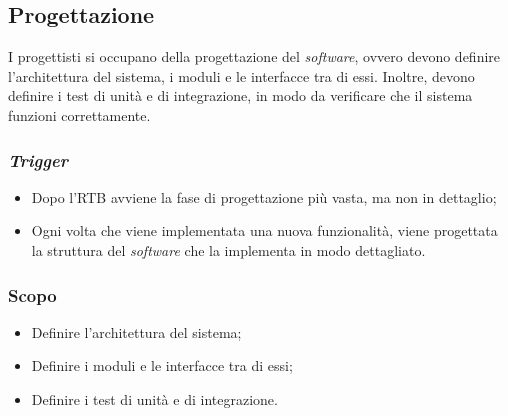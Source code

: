 \subsection{Progettazione}
\label{progettazione}

I progettisti si occupano della progettazione del \textit{software}, ovvero
devono definire l'architettura del sistema, i moduli e le interfacce tra di
essi. Inoltre, devono definire i test di unità e di integrazione, in modo da
verificare che il sistema funzioni correttamente.

\subsubsection{\textit{Trigger}}

\begin{itemize}
	\item Dopo l'RTB avviene la fase di progettazione più vasta, ma non in
	      dettaglio;

	\item Ogni volta che viene implementata una nuova funzionalità, viene
	      progettata la struttura del \textit{software} che la implementa in
	      modo dettagliato.
\end{itemize}

\subsubsection{Scopo}
\begin{itemize}
	\item Definire l'architettura del sistema;
	\item Definire i moduli e le interfacce tra di essi;
	\item Definire i test di unità e di integrazione.
\end{itemize}


